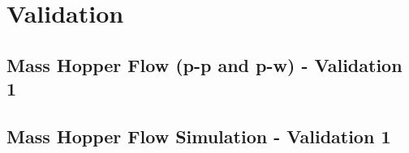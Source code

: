 
\chapter{Validation}
\label{cap:validation}

\lipsum[1]


\section{Mass Hopper Flow (p-p and p-w) - Validation 1}
\label{sec:masshopperflow}

\lipsum[1]

\section{Mass Hopper Flow Simulation - Validation 1}
\label{sec:masshopperflowsimulation}

\lipsum[1]